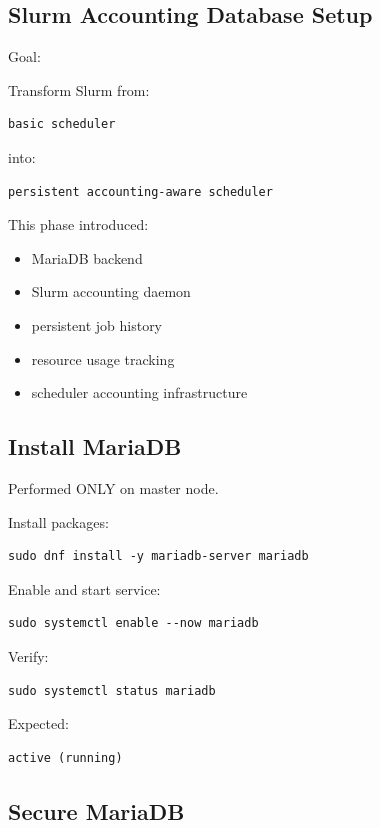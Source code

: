 \documentclass[11pt]{article}
\begin{document}
\subsection{Slurm Accounting Database Setup}
\label{sec:orgb86cfc4}

Goal:

Transform Slurm from:

\begin{verbatim}
basic scheduler
\end{verbatim}

into:

\begin{verbatim}
persistent accounting-aware scheduler
\end{verbatim}

This phase introduced:

\begin{itemize}
\item MariaDB backend
\item Slurm accounting daemon
\item persistent job history
\item resource usage tracking
\item scheduler accounting infrastructure
\end{itemize}
\subsection{Install MariaDB}
\label{sec:org1c74106}

Performed ONLY on master node.

Install packages:

\begin{verbatim}
sudo dnf install -y mariadb-server mariadb
\end{verbatim}

Enable and start service:

\begin{verbatim}
sudo systemctl enable --now mariadb
\end{verbatim}

Verify:

\begin{verbatim}
sudo systemctl status mariadb
\end{verbatim}

Expected:

\begin{verbatim}
active (running)
\end{verbatim}
\subsection{Secure MariaDB}
\label{sec:org5828630}
\end{document}
